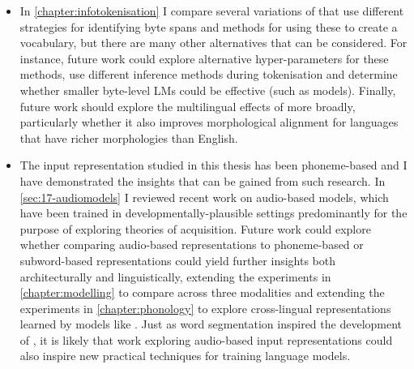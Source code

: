 \begin{itemize}
    \item In \cref{chapter:infotokenisation} I compare several variations of \bytespan that use different strategies for identifying byte spans and methods for using these to create a vocabulary, but there are many other alternatives that can be considered. For instance, future work could explore alternative hyper-parameters for these methods, use different inference methods during tokenisation and determine whether smaller byte-level LMs could be effective (such as \ngram models). Finally, future work should explore the multilingual effects of \bytespan more broadly, particularly whether it also improves morphological alignment for languages that have richer morphologies than English.
    \item The input representation studied in this thesis has been phoneme-based and I have demonstrated the insights that can be gained from such research. In \cref{sec:17-audiomodels} I reviewed recent work on audio-based models, which have been trained in developmentally-plausible settings predominantly for the purpose of exploring theories of acquisition. Future work could explore whether comparing audio-based representations to phoneme-based or subword-based representations could yield further insights both architecturally and linguistically, extending the experiments in \cref{chapter:modelling} to compare across three modalities and extending the experiments in \cref{chapter:phonology} to explore cross-lingual representations learned by models like  \stela. Just as word segmentation inspired the development of \bytespan, it is likely that work exploring audio-based input representations could also inspire new practical techniques for training language models. 
\end{itemize}
